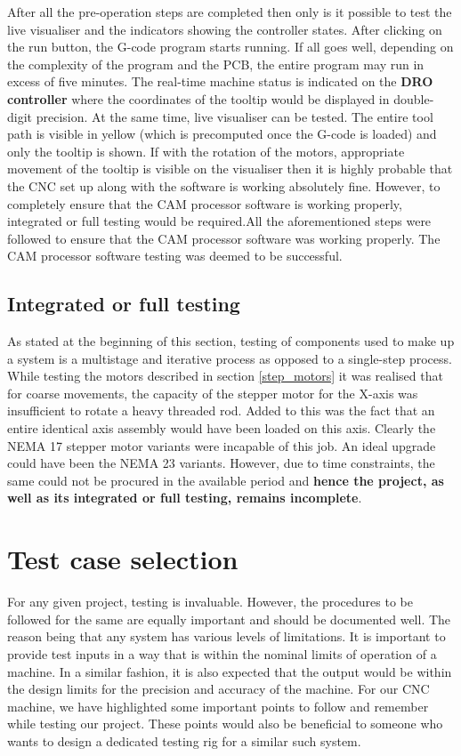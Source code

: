 After all the pre-operation steps are completed then only is it possible to test the live visualiser and the indicators showing the controller states. After clicking on the run button, the G-code program starts running. If all goes well, depending on the complexity of the program and the PCB, the entire program may run in excess of five minutes. The real-time machine status is indicated on the \textbf{DRO controller} where the coordinates of the tooltip would be displayed in double-digit precision. At the same time, live visualiser can be tested. The entire tool path is visible in yellow (which is precomputed once the G-code is loaded) and only the tooltip is shown. If with the rotation of the motors, appropriate movement of the tooltip is visible on the visualiser then it is highly probable that the CNC set up along with the software is working absolutely fine. However, to completely ensure that the CAM processor software is working properly, integrated or full testing would be required.All the aforementioned steps were followed to ensure that the CAM processor software was working properly. The CAM processor software testing was deemed to be successful.


\subsection{Integrated or full testing}

As stated at the beginning of this section, testing of components used to make up a system is a multistage and iterative process as opposed to a single-step process. While testing the motors described in section \ref{step_motors} it was realised that for coarse movements, the capacity of the stepper motor for the X-axis was insufficient to rotate a heavy threaded rod. Added to this was the fact that an entire identical axis assembly would have been loaded on this axis. Clearly the NEMA 17 stepper motor variants were incapable of this job. An ideal upgrade could have been the NEMA 23 variants. However, due to time constraints, the same could not be procured in the available period and \textbf{hence the project, as well as its integrated or full testing, remains incomplete}.

\section{Test case selection}

For any given project, testing is invaluable. However, the procedures to be followed for the same are equally important and should be documented well. The reason being that any system has various levels of limitations. It is important to provide test inputs in a way that is within the nominal limits of operation of a machine. In a similar fashion, it is also expected that the output would be within the design limits for the precision and accuracy of the machine. For our CNC machine, we have highlighted some important points to follow and remember while testing our project. These points would also be beneficial to someone who wants to design a dedicated testing rig for a similar such system. \cite{online_book}

